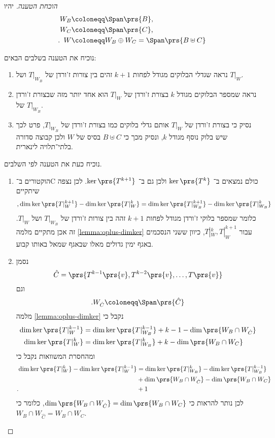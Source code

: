 \documentclass[a4paper,10pt,twoside,openany]{article}
\begin{document}
\begin{proof}[הוכחת הטענה]
יהיו
\begin{align*}
W_B &\coloneqq \Span\prs{B} \text{,} \\
W_C &\coloneqq \Span\prs{C} \text{,} \\
\text{.} \hphantom{a} W &\coloneqq W_B \oplus W_C = \Span\prs{B \uplus C}
\end{align*}

נוכיח את הטענה בשלבים הבאים:

\begin{enumerate}
\item
נראה שגדלי הבלוקים מגודל לפחות
$k+1$
זהים בין צורות ז'ורדן של
$T|_{W_B}$
ושל
$T|_W$.

\item
נראה שמספר הבלוקים מגודל
$k$
בצורת ז'ורדן של
$T|_W$
הוא אחד יותר מזה שבצורת ז'ורדן של
$T|_{W_B}$.

\item
נסיק כי בצורת ז'ורדן של
$T|_W$
אותם גדלי בלוקים כמו בצורת ז'ורדן של
$T|_{W_B}$,
פרט לכך שיש בלוק נוסף מגודל
$k$,
ונסיק מכך כי
$B \uplus C$
בסיס של
$W$
ולכן קבוצה סדורה בלתי־תלויה לינארית.
\end{enumerate}

נוכיח כעת את הטענה לפי השלבים.

\begin{enumerate}
\item %

הוקטורים ב־C כולם נמצאים ב־%
$\ker\prs{T^k}$
ולכן גם ב־%
$\ker\prs{T^{k+1}}$.
לכן נצפה שיתקיים
\[\text{,}\dim \ker\prs{T|_W^{k+1}} - \dim \ker\prs{T|_W^k} = \dim \ker\prs{T|_{W_B}^{k+1}} - \dim \ker\prs{T|_{W_B}^k}\]
כלומר שמספר בלוקי ז'ורדן מגודל לפחות
$k+1$
זהה בין צורות ז'ורדן של
$T|_{W_B}$
ושל
$T|_W$.
זה אכן מתקיים מלמה
\ref{lemma:oplus-dimker}
עבור
$T|_W^k, T|_W^{k+1}$,
כיוון ששני הנסכמים באגף ימין גדולים מאלו שבאגף שמאל באותו קבוע.

\item %

נסמן
\[\hat{C} = \prs{T^{k-1}\prs{v}, T^{k-2}\prs{v}, \ldots, T\prs{v}}\]
וגם
\[\text{.} W_{\hat{C}} \coloneqq \Span\prs{\hat{C}}\]
מלמה
\ref{lemma:oplus-dimker}
נקבל כי
\begin{align*}
\dim \ker \prs{T|_W^{k-1}} &= \dim \ker \prs{T|_{W_B}^{k-1}} + k - 1 - \dim\prs{W_B \cap W_{\hat{C}}} \\
\dim \ker \prs{T|_W^k} &= \dim \ker \prs{T|_{W_B}^k} + k - \dim\prs{W_B \cap W_C}
\end{align*}
ומהחסרת המשוואות נקבל כי
\begin{align*}
\dim \ker \prs{T|_W^k} - \dim \ker \prs{T|_W^{k-1}} &=
\dim \ker \prs{T|_{W_B}^k} - \dim \ker \prs{T|_{W_B}^{k-1}} 
\\& +
\dim\prs{W_B \cap W_{\hat{C}}} - \dim\prs{W_B \cap W_C}
\\ \text{.} \hphantom{\dim \ker \prs{T|_W^k} - \dim \ker \prs{T|_W^{k-1}}} & +
1
\end{align*}
לכן נותר להראות כי
$\dim\prs{W_B \cap W_{\hat{C}}} = \dim\prs{W_B \cap W_C}$,
כלומר כי
$W_B \cap W_{\hat{C}} = W_B \cap W_C$.


\end{enumerate}
\end{proof}
\end{document}
